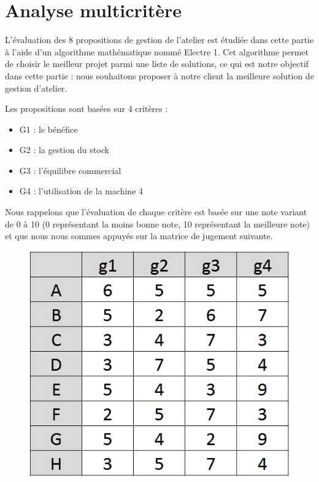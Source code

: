 \documentclass[a4paper,10pt]{article}
\begin{document}
\newpage
\part{Analyse multicritère}

L'évaluation des 8 propositions de gestion de l'atelier est étudiée dans cette partie à l'aide d'un algorithme mathématique nommé Electre 1. Cet algorithme permet de choisir le meilleur projet parmi une liste de solutions, ce qui est notre objectif dans cette partie : nous souhaitons proposer à notre client la meilleure solution de gestion d'atelier.

Les propositions sont basées sur 4 critères  :
\begin{itemize}
\item G1 : le bénéfice
\item G2 : la gestion du stock
\item G3 : l'équilibre commercial
\item G4 : l'utilisation de la machine 4
\end{itemize}

Nous rappelons que l'évaluation de chaque critère est basée sur une note variant de 0 à 10 (0 représentant la moins bonne note, 10 représentant la meilleure note) et que nous nous sommes appuyés sur la matrice de jugement suivante.

\begin{figure}[h]
\begin{center}
\includegraphics[scale=0.3]{img/AD-Jugement.jpg}
\end{center}
\end{figure}
\end{document}
